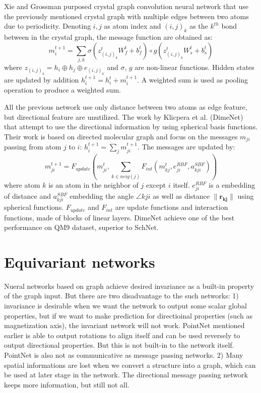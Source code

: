 \documentclass{IEEEtran}
\begin{document}
Xie and Grossman purposed crystal graph convolution neural network\cite{xie_crystal_2018} that use the previously
mentioned crystal graph with multiple edges between two atoms due to periodicity. Denoting $i,j$ as atom 
index and $(i,j)_k$ as the $k^{th}$ bond between in the crystal graph, the message function are obtained as:
\begin{equation}
    m_i^{t+1} = \sum_{j,k} \sigma(z^t_{(i,j)_k}W_f^{t} + b_f^t) \circ g(z^t_{(i,j)_k}W_s^{t} + b_s^t)
\end{equation}
where $z_{(i,j)_k} = h_i \oplus h_j \oplus e_{(i,j)_k}$ and $\sigma$, $g$ are 
non-linear functions. 
Hidden states are updated by addition $h_i^{t+1} = h_i^t + m_i^{t+1}$. A weighted sum is used 
as pooling operation to produce a weighted sum. 

All the previous network use only distance between two atoms as edge feature, 
but directional feature are unutilized. The work by Klicpera et al.\cite{klicpera_directional_2020} (DimeNet) 
that attempt to use the directional information by using spherical basis functions. 
Their work is based on directed molecular graph and focus on the messages $m_{ji}$ passing from 
atom $j$ to $i$: $h_i^{t+1} = \sum_j m^{t+1}_{ji}$. The messages are updated by:
\begin{equation}
    m_{ji}^{t+1} 
    = F_{update}\left( m_{ji}^t, \sum_{k \in neig(j)} F_{int}(m_{kj}^{t}, e_{ji}^{RBF}, a^{SBF}_{kji}) \right)
\end{equation}
where atom $k$ is an atom in the neighbor of $j$ except $i$ itself. $e_{ji}^{RBF}$ is a 
embedding of distance and $a^{SBF}_{kji}$ embedding the angle $\angle kji$ as well as distance 
$\|\mathbf{r_{kj}}\|$ using spherical functions. 
$F_{update}$ and $F_{int}$ are update functions and interaction functions, made of blocks 
of linear layers. DimeNet achieve one of the best performance on QM9 dataset, superior to SchNet.

\section{Equivariant networks}
Nueral networks based on graph achieve desired invariance as a built-in property of the graph input.  
But there are two disadvantage to the such networks: 
1) invariance is desirable when we want the network to output some scalar global properties, but if we 
want to make prediction for directioinal properties (such as magnetization axis), the invariant network 
will not work. PointNet mentioned earlier is able to output rotations to align itself and can be used 
reversely to output directional properties. But this is not built-in to the network itself. PointNet is 
also not as communicative as message passing networks.
2) Many spatial informations are lost when we convert a structure into a graph, which can be used 
at later stage in the network. The directional message passing network keeps more information, but 
still not all.
\end{document}
